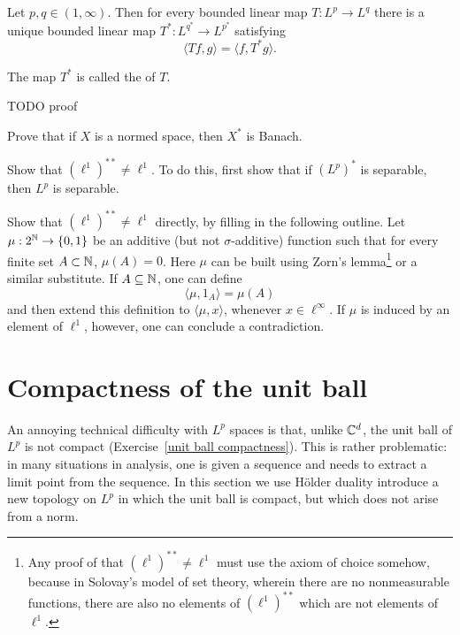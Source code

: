 \begin{theorem}
Let $p, q \in (1, \infty)$. Then for every bounded linear map $T: L^{p} \to L^{q}$ there is a unique bounded linear map $T^{*}: L^{q^{*}} \to L^{p^{*}}$ satisfying
\[\langle Tf, g\rangle = \langle f, T^{*}g\rangle.\]
\end{theorem}
\begin{definition}
The map $T^{*}$ is called the  of $T$.
\end{definition}
TODO proof





\begin{exercise}\label{dual space is banach}
Prove that if $X$ is a normed space, then $X^{*}$ is Banach.
\end{exercise}

\begin{exercise}
Show that ${(\ell^{1})}^{**} \neq \ell^{1}$.
To do this, first show that if ${(L^{p})}^{*}$ is separable, then $L^{p}$ is separable.
\end{exercise}

\begin{exercise}
Show that ${(\ell^{1})}^{**} \neq \ell^{1}$ directly, by filling in the following outline.
Let $\mu: 2^{\mathbb{N}} \to \{0, 1\}$ be an additive (but not $\sigma$-additive) function such that for every finite set $A \subset \mathbb{N}$, $\mu(A) = 0$.
Here $\mu$ can be built using Zorn's lemma\footnote{Any proof of that ${(\ell^{1})}^{**} \neq \ell^{1}$ must use the axiom of choice somehow, because in Solovay's model of set theory, wherein there are no nonmeasurable functions, there are also no elements of ${(\ell^{1})}^{**}$ which are not elements of $\ell^{1}$.} or a similar substitute.
If $A \subseteq \mathbb{N}$, one can define
\[\langle \mu, 1_{A}\rangle = \mu(A)\]
and then extend this definition to $\langle \mu, x\rangle$, whenever $x \in \ell^{\infty}$.
If $\mu$ is induced by an element of $\ell^{1}$, however, one can conclude a contradiction.
\end{exercise}

\section{Compactness of the unit ball}
An annoying technical difficulty with $L^{p}$ spaces is that, unlike $\mathbb{C}^{d}$, the unit ball of $L^{p}$ is not compact (Exercise~\ref{unit ball compactness}).
This is rather problematic: in many situations in analysis, one is given a sequence and needs to extract a limit point from the sequence.
In this section we use H\"older duality introduce a new topology on $L^{p}$ in which the unit ball is compact, but which does not arise from a norm.

